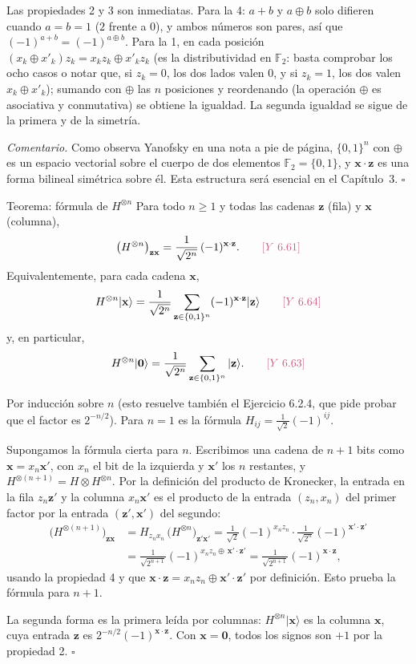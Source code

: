 \documentclass[11pt, a4paper, twoside, openright]{report}
\providecommand{\ket}[1]{|#1\rangle}
\newcommand{\bx}{\mathbf{x}}
\newcommand{\bz}{\mathbf{z}}
\newcommand{\bcero}{\mathbf{0}}
\newcommand{\bits}[1]{\{0,1\}^{#1}}
\newcommand{\F}{\mathbb{F}_2}
\newcommand{\Yan}[1]{\textcolor{rosaviejo}{\small[Y~#1]}}  %
\begin{document}
\begin{demo}
Las propiedades 2 y 3 son inmediatas. Para la 4: $a + b$ y $a\oplus b$ solo difieren cuando $a = b = 1$ ($2$ frente a $0$), y ambos números son pares, así que $(-1)^{a+b} = (-1)^{a\oplus b}$. Para la 1, en cada posición $(x_k\oplus x'_k)z_k = x_kz_k\oplus x'_kz_k$ (es la distributividad en $\F$: basta comprobar los ocho casos o notar que, si $z_k = 0$, los dos lados valen $0$, y si $z_k = 1$, los dos valen $x_k\oplus x'_k$); sumando con $\oplus$ las $n$ posiciones y reordenando (la operación $\oplus$ es asociativa y conmutativa) se obtiene la igualdad. La segunda igualdad se sigue de la primera y de la simetría.

\textit{Comentario.} Como observa Yanofsky en una nota a pie de página, $\bits{n}$ con $\oplus$ es un espacio vectorial sobre el cuerpo de dos elementos $\F = \{0,1\}$, y $\bx\cdot\bz$ es una forma bilineal simétrica sobre él. Esta estructura será esencial en el Capítulo~3. \hfill$\square$
\end{demo}

\begin{teoria}{Teorema: fórmula de $H^{\otimes n}$}
Para todo $n\ge1$ y todas las cadenas $\bz$ (fila) y $\bx$ (columna),
\[ \big(H^{\otimes n}\big)_{\bz\bx} = \frac{1}{\sqrt{2^n}}\,(-1)^{\bx\cdot\bz}. \qquad \Yan{6.61} \]
Equivalentemente, para cada cadena $\bx$,
\[ H^{\otimes n}\ket{\bx} = \frac{1}{\sqrt{2^n}}\sum_{\bz\in\bits{n}}(-1)^{\bx\cdot\bz}\ket{\bz} \qquad \Yan{6.64} \]
y, en particular,
\[ H^{\otimes n}\ket{\bcero} = \frac{1}{\sqrt{2^n}}\sum_{\bz\in\bits{n}}\ket{\bz}. \qquad \Yan{6.63} \]
\end{teoria}

\begin{demo}
Por inducción sobre $n$ (esto resuelve también el Ejercicio 6.2.4, que pide probar que el factor es $2^{-n/2}$). Para $n = 1$ es la fórmula $H_{ij} = \frac{1}{\sqrt2}(-1)^{ij}$.

Supongamos la fórmula cierta para $n$. Escribimos una cadena de $n+1$ bits como $\bx = x_n\bx'$, con $x_n$ el bit de la izquierda y $\bx'$ los $n$ restantes, y $H^{\otimes(n+1)} = H\otimes H^{\otimes n}$. Por la definición del producto de Kronecker, la entrada en la fila $z_n\bz'$ y la columna $x_n\bx'$ es el producto de la entrada $(z_n, x_n)$ del primer factor por la entrada $(\bz', \bx')$ del segundo:
\begin{align*}
\big(H^{\otimes(n+1)}\big)_{\bz\bx} &= H_{z_nx_n}\,\big(H^{\otimes n}\big)_{\bz'\bx'} = \frac{1}{\sqrt2}(-1)^{x_nz_n}\cdot\frac{1}{\sqrt{2^n}}(-1)^{\bx'\cdot\bz'} \\
&= \frac{1}{\sqrt{2^{n+1}}}(-1)^{x_nz_n\oplus\,\bx'\cdot\bz'} = \frac{1}{\sqrt{2^{n+1}}}(-1)^{\bx\cdot\bz},
\end{align*}
usando la propiedad 4 y que $\bx\cdot\bz = x_nz_n\oplus\bx'\cdot\bz'$ por definición. Esto prueba la fórmula para $n+1$.

La segunda forma es la primera leída por columnas: $H^{\otimes n}\ket{\bx}$ es la columna $\bx$, cuya entrada $\bz$ es $2^{-n/2}(-1)^{\bx\cdot\bz}$. Con $\bx = \bcero$, todos los signos son $+1$ por la propiedad 2. \hfill$\square$
\end{demo}
\end{document}
